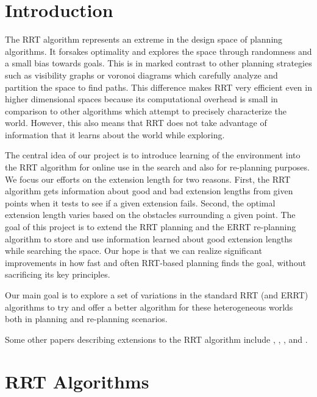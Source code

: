 \documentclass[10pt,twoside,twocolumn]{article}
\begin{document}
\maketitle

\section{Introduction} 
The RRT algorithm represents an extreme in the design space of planning algorithms.  
It forsakes optimality and explores the space through randomness and a small bias towards goals.  This is in marked contrast to other planning strategies such as visibility graphs or voronoi diagrams which carefully analyze and partition the space to find paths.  
This difference makes RRT very efficient even in higher dimensional spaces because its computational overhead is small in comparison to other algorithms which attempt to precisely characterize the world.  However, this also means that RRT does not take advantage of information that it learns about the world while exploring.

The central idea of our project is to introduce learning of the environment into the RRT algorithm for online use in the search and also for re-planning purposes.  We focus our efforts on the extension length for two reasons.  First, the RRT algorithm gets information about good and bad extension lengths from given points when it tests to see if a given extension fails.  Second, the optimal extension length varies based on the obstacles surrounding a given point.  The goal of this project is to extend the RRT planning and the ERRT re-planning algorithm to store and use information learned about good extension lengths while searching the space.  Our hope is that we can realize significant improvements in how fast and often RRT-based planning finds the goal, without sacrificing its key principles.

Our main goal is to explore a set of variations in the standard RRT (and ERRT) algorithms to try and offer a better algorithm for these heterogeneous worlds both in planning and re-planning scenarios.

Some other papers describing extensions to the RRT algorithm include
\cite{Lavalle98rapidly-exploringrandom},
\cite{Lindemann04incrementallyreducing}, \cite{Jaillet05adaptivetuning}, and \cite{moplan2009}.


\section{RRT Algorithms}
\end{document}
